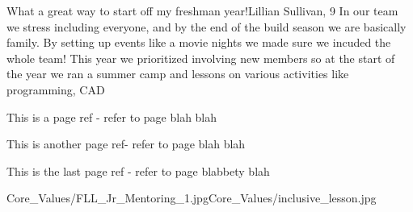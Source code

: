 {What a great way to start off my freshman year!}{Lillian Sullivan, 9}
{In our team we stress including everyone, and by the end of the build season we are basically family. By setting up events like a movie nights we made sure we incuded the whole team! This year we prioritized involving new members so at the start of the year we ran a summer camp and lessons on various activities like programming, CAD}
{\item[$\blacksquare$] This is a page ref - refer to page blah blah
 \item[$\blacksquare$] This is another page ref- refer to page blah blah
 \item[$\blacksquare$] This is the last page ref - refer to page blabbety blah}
{Core_Values/FLL_Jr_Mentoring_1.jpg}{Core_Values/inclusive_lesson.jpg}
